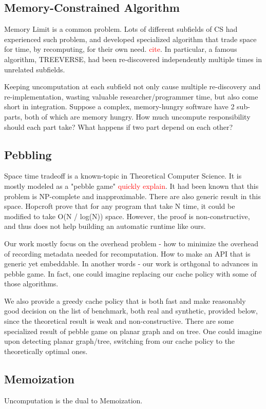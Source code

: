 \documentclass[acmsmall]{acmart}
\newcommand\todo[1]{\textcolor{red}{#1}}
\begin{document}
	\subsection{Memory-Constrained Algorithm}
	Memory Limit is a common problem. Lots of different subfields of CS had experienced such problem, and developed specialized algorithm that trade space for time, by recomputing, for their own need. \todo{cite}. In particular, a famous algorithm, TREEVERSE, had been re-discovered independently multiple times in unrelated subfields.
	
	Keeping uncomputation at each subfield not only cause multiple re-discovery and re-implementation, wasting valuable researcher/programmer time, but also come short in integration. Suppose a complex, memory-hungry software have 2 sub-parts, both of which are memory hungry. How much uncompute responsibility should each part take? What happens if two part depend on each other?
	\subsection{Pebbling}
	Space time tradeoff is a known-topic in Theoretical Computer Science. It is mostly modeled as a "pebble game" \todo{quickly explain}. It had been known that this problem is NP-complete and inapproximable. There are also generic result in this space. Hopcroft prove that for any program that take N time, it could be modified to take O(N / log(N)) space. However, the proof is non-constructive, and thus does not help building an automatic runtime like ours.
	
	Our work mostly focus on the overhead problem - how to minimize the overhead of recording metadata needed for recomputation. How to make an API that is generic yet embeddable. In another words - our work is orthgonal to advances in pebble game. In fact, one could imagine replacing our cache policy with some of those algorithms.
	
	We also provide a greedy cache policy that is both fast and make reasonably good decision on the list of benchmark, both real and synthetic, provided below, since the theoretical result is weak and non-constructive. There are some specialized result of pebble game on planar graph and on tree. One could imagine upon detecting planar graph/tree, switching from our cache policy to the theoretically optimal ones.
	\subsection{Memoization}
	Uncomputation is the dual to Memoization.
\end{document}
